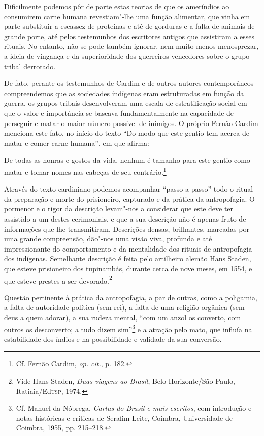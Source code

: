 Dificilmente podemos pôr de parte estas teorias de que os ameríndios
ao consumirem carne humana revestiam"-lhe uma função alimentar, que
vinha em parte substituir a escassez de proteínas e até de gorduras e a
falta de animais de grande porte, até pelos testemunhos dos escritores
antigos que assistiram a esses rituais. No entanto, não se pode também
ignorar, nem muito menos menosprezar, a ideia de vingança e da
superioridade dos guerreiros vencedores sobre o grupo tribal derrotado.

De fato, perante os testemunhos de Cardim e de outros autores
contemporâneos compreendemos que as sociedades indígenas eram
estruturadas em função da guerra, os grupos tribais desenvolveram uma
escala de estratificação social em que o valor e importância se baseava
fundamentalmente na capacidade de perseguir e matar o maior número
possível de inimigos. O próprio Fernão Cardim menciona este fato, no
início do texto ``Do modo que este gentio tem
acerca de matar e comer carne humana'', em que afirma:

\begin{hedraquote}
De todas as honras e gostos da vida, nenhum é tamanho para este gentio
como matar e tomar nomes nas cabeças de seu contrário.\footnote{ Cf. Fernão 
Cardim, \textit{op. cit.}, p. 182.} 
\end{hedraquote}

Através do texto cardiniano podemos acompanhar ``passo a passo'' todo
o ritual da preparação e morte do prisioneiro, capturado e da prática
da antropofagia. O pormenor e o rigor da descrição levam"-nos a
considerar que este deve ter assistido a um destes cerimoniais, e que a
sua descrição não é apenas fruto de informações que lhe transmitiram.
Descrições densas, brilhantes, marcadas por uma grande compreensão,
dão"-nos uma visão viva, profunda e até impressionante do comportamento
e da mentalidade dos rituais de antropofagia dos indígenas. Semelhante
descrição é feita pelo artilheiro alemão Hans Staden, que esteve
prisioneiro dos tupinambás, durante cerca de nove meses, em 1554, e que
esteve prestes a ser devorado.\footnote{ Vide Hans Staden,
\textit{Duas viagens ao Brasil}, Belo Horizonte/São Paulo, Itatiaia/Ed\textsc{usp}, 1974.} 

Questão pertinente à prática da antropofagia, a par de outras, como a
poligamia, a falta de autoridade política (sem rei), a falta de uma
religião orgânica (sem deus a quem adorar), a sua rudeza mental,
``com um anzol os converto, com outros os desconverto; a tudo
dizem sim''\footnote{ Cf. Manuel da Nóbrega, \textit{Cartas do
Brasil e mais escritos}, com introdução e notas históricas e críticas
de Serafim Leite, Coimbra, Universidade de Coimbra, 1955, pp. 215--218.}
e a atração pelo mato, que influía na estabilidade dos índios e na
possibilidade e validade da sua conversão. 

